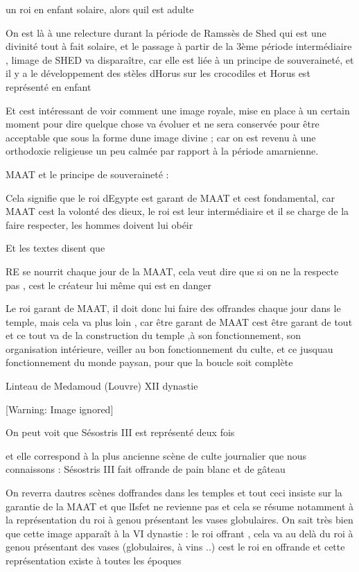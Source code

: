 \documentclass{article}
\begin{document}
un roi en enfant solaire, alors qu{\textquotesingle}il est adulte

On est là à une relecture durant la période de Ramssès de Shed qui est
une divinité tout à fait solaire, et le passage à partir de la 3ème
période intermédiaire , l{\textquotesingle}image de SHED va
disparaître, car elle est liée à un principe de souveraineté,  et il y
a le développement des stèles d{\textquotesingle}Horus sur les
crocodiles et Horus est représenté en enfant

Et c{\textquotesingle}est intéressant de voir comment une image royale,
mise en place à un certain moment pour dire quelque chose va évoluer et
ne sera conservée pour être acceptable que sous la forme
d{\textquotesingle}une image divine ; car on est revenu à une
orthodoxie religieuse un peu calmée par rapport à la période
amarnienne.

MAAT et le principe de souveraineté :

Cela signifie que le roi d{\textquotesingle}Egypte est garant de MAAT et
c{\textquotesingle}est fondamental, car MAAT c{\textquotesingle}est la
volonté des dieux, le roi est leur intermédiaire et il se charge de la
faire respecter, les hommes doivent lui obéir

Et les textes disent que 

RE se nourrit chaque jour de la MAAT, cela veut dire que si on ne la
respecte pas , c{\textquotesingle}est le créateur lui même qui est en
danger

Le roi garant de MAAT, il doit donc lui faire des offrandes chaque jour
dans le temple, mais cela va plus loin , car être garant de MAAT
c{\textquotesingle}est être garant de tout et ce tout va de la
construction du temple ,à son fonctionnement, son organisation
intérieure, veiller au bon fonctionnement du culte, et ce
jusqu{\textquotesingle}au fonctionnement du monde paysan, pour que la
boucle soit complète

Linteau de Medamoud (Louvre) XII dynastie

  [Warning: Image ignored] %
 

On peut voit que Sésostris III est représenté deux fois 

et elle correspond à la plus ancienne scène de culte journalier que nous
connaissons : Sésostris III fait offrande de pain blanc et de gâteau

On reverra d{\textquotesingle}autres scènes d{\textquotesingle}offrandes
dans les temples et tout ceci insiste sur la garantie de la MAAT et que
l{\textquotesingle}Isfet ne revienne pas et cela se résume notamment à
la représentation du roi à genou présentant les vases globulaires. On
sait très bien que cette image apparaît à la VI dynastie  : le roi
offrant , cela va au delà du roi à genou présentant des vases
(globulaires, à vins ..) c{\textquotesingle}est le roi en offrande et
cette représentation existe à toutes les époques
\end{document}
